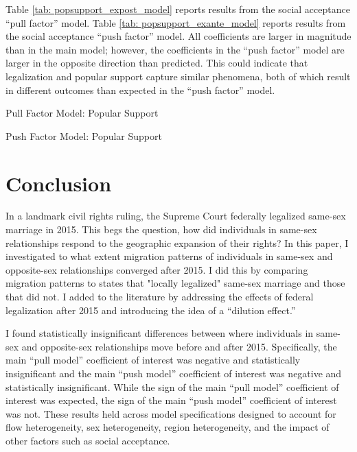 \documentclass[12pt,letterpaper]{article}
\begin{document}
Table \ref{tab: popsupport_expost_model} reports results from the social acceptance “pull factor” model. Table \ref{tab: popsupport_exante_model} reports results from the social acceptance “push factor” model. All coefficients are larger in magnitude than in the main model; however, the coefficients in the “push factor” model are larger in the opposite direction than predicted. This could indicate that legalization and popular support capture similar phenomena, both of which result in different outcomes than expected in the “push factor” model.

\begin{table}[h] %
    \centering
    \caption{Pull Factor Model: Popular Support}
    \label{tab: popsupport_expost_model}
    
\end{table}
\begin{table}[h]
    \centering
    \caption{Push Factor Model: Popular Support}
    \label{tab: popsupport_exante_model}
    
\end{table}

\section{Conclusion}

In a landmark civil rights ruling, the Supreme Court federally legalized same-sex marriage in 2015. This begs the question, how did individuals in same-sex relationships respond to the geographic expansion of their rights? In this paper, I investigated to what extent migration patterns of individuals in same-sex and opposite-sex relationships converged after 2015. I did this by comparing migration patterns to states that "locally legalized" same-sex marriage and those that did not. I added to the literature by addressing the effects of federal legalization after 2015 and introducing the idea of a “dilution effect.”

I found statistically insignificant differences between where individuals in same-sex and opposite-sex relationships move before and after 2015. Specifically, the main “pull model” coefficient of interest was negative and statistically insignificant and the main “push model” coefficient of interest was negative and statistically insignificant. While the sign of the main “pull model” coefficient of interest was expected, the sign of the main “push model” coefficient of interest was not. These results held across model specifications designed to account for flow heterogeneity, sex heterogeneity, region heterogeneity, and the impact of other factors such as social acceptance. 
\end{document}
